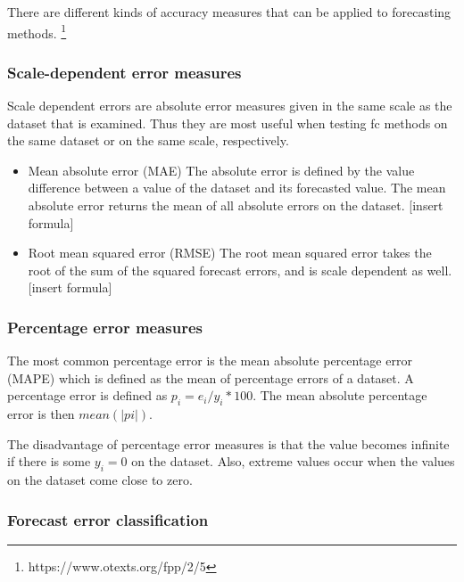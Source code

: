 There are different kinds of accuracy measures that can be applied to forecasting methods. \footnote{https://www.otexts.org/fpp/2/5}

\subsubsection{Scale-dependent error measures}

Scale dependent errors are absolute error measures given in the same scale as the dataset that is examined. Thus they are most useful when testing fc methods on the same dataset or on the same scale, respectively. 

\begin{itemize}
\item Mean absolute error (MAE)
The absolute error is defined by the value difference between a value of the dataset and its forecasted value. The mean absolute error returns the mean of all absolute errors on the dataset. [insert formula]

\item Root mean squared error (RMSE)
The root mean squared error takes the root of the sum of the squared forecast errors, and is scale dependent as well. [insert formula]

\end{itemize}

\subsubsection{Percentage error measures}

The most common percentage error is the mean absolute percentage error (MAPE) which is defined as the mean of percentage errors of a dataset. A percentage error is defined as $p_i=e_i/y_i * 100$. The mean absolute percentage error is then $mean(|pi|)$. 

The disadvantage of percentage error measures is that the value becomes infinite if there is some $y_i = 0$ on the dataset. Also, extreme values occur when the values on the dataset come close to zero. 


\subsubsection{Forecast error classification}

